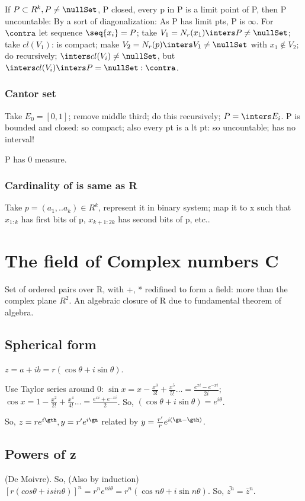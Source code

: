 \documentclass[oneside, article]{memoir}
\begin{document}
If $P \subset R^{k}, P \neq \nullSet$, P closed, every p in P is a limit point of P, then P uncountable: By a sort of diagonalization: As P has limit pts, P is $\infty$. For $\contra$ let sequence $\seq{x_{i}} = P$; take $V_{1} = N_{r}(x_{1}) \inters P \neq \nullSet$; take $cl(V_{1})$: is compact; make $V_{2} =  N_{r}(p) \inters V_{1} \neq \nullSet$ with $x_{1} \notin V_{2}$; do recursively; $\inters cl(V_{i}) \neq \nullSet$, but $\inters cl(V_{i}) \inters P = \nullSet : \contra$.

\subsubsection{Cantor set}
Take $E_{0} = [0, 1]$; remove middle third; do this recursively; $P = \inters E_{i}$. P is bounded and closed: so compact; also every pt is a lt pt: so uncountable; has no interval!

P has 0 measure. \why

\subsubsection{Cardinality of  is same as R}
Take $p = (a_{1}, .. a_{k}) \in R^{k}$, represent it in binary system; map it to x such that $x_{1:k}$ has first bits of p, $x_{k+1:2k}$ has second bits of p, etc..

\section{The field of Complex numbers C}
Set of ordered pairs over R, with +, * redifined to form a field: more than the complex plane $R^{2}$. An algebraic closure of R due to fundamental theorem of algebra.

\subsection{Spherical form}
$z=a + ib = r (\cos \theta + i \sin \theta)$.

Use Taylor series around 0: $\sin x = x-\frac{x^{3}}{3!}+\frac{x^{5}}{5!} \dots = \frac{e^{xi}-e^{-xi}}{2i}$; $\cos x = 1-\frac{x^{2}}{2!}+\frac{x^{4}}{4!} \dots = \frac{e^{xi}+e^{-xi}}{2}$. So, $(\cos \theta + i \sin \theta) = e^{i\theta}$.

So, $z = re^{i\gth}, y = r'e^{i\ga}$ related by $y = \frac{r'}{r}e^{i(\ga-\gth)}$.

\subsection{Powers of z}
(De Moivre). So, (Also by induction) $[r (cos \theta + i sin \theta)]^{n} = r^{n} e^{ni\theta} = r^{n} (\cos n\theta + i \sin n\theta)$. So, $\bar{z^{n}} = \bar{z}^{n}$.
\end{document}
